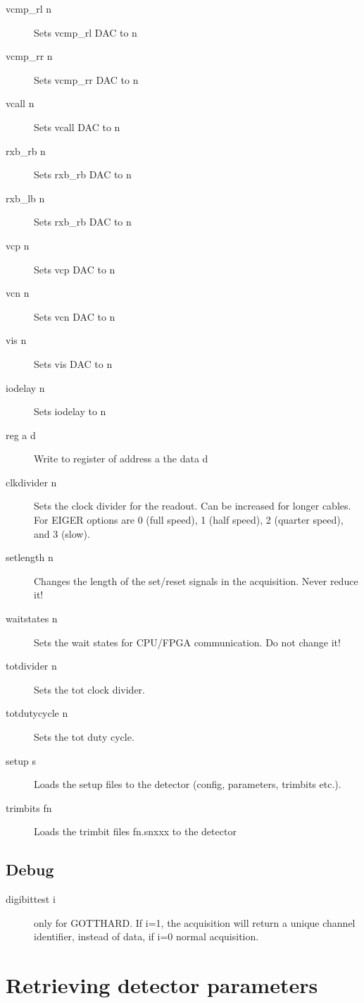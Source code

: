 \documentclass{article}
\newcommand{\E}{EIGER\xspace}
\begin{document}
\begin{description}
\item [vcmp\_rl n] Sets vcmp\_rl DAC to n 
\item [vcmp\_rr n] Sets vcmp\_rr DAC to n 
\item [vcall n] Sets vcall DAC to n 
\item [rxb\_rb n] Sets rxb\_rb DAC to n 
\item [rxb\_lb n] Sets rxb\_rb DAC to n 
\item [vcp n] Sets vcp DAC to n 
\item [vcn n] Sets vcn DAC to n 
\item [vis n] Sets vis DAC to n 
\item [iodelay n] Sets iodelay to n 
\item[reg a d]   Write to register of address a the data d  
\item[clkdivider n]  Sets the clock divider for the readout. Can be increased for longer cables. For \E options are 0 (full speed), 1 (half speed), 2 (quarter speed), and 3 (slow).
\item[setlength n]  Changes the length of the set/reset signals in the acquisition. Never reduce it!     
\item[waitstates n] Sets the wait states for CPU/FPGA communication. Do not change it!
\item[totdivider n]  Sets the tot clock divider.
\item[totdutycycle n] Sets the tot duty cycle.
\item[setup s] Loads the setup files to the detector (config, parameters, trimbits etc.).
\item[trimbits fn] Loads the trimbit files fn.snxxx to the detector
\end{description}
 
 
\subsection{Debug}
\begin{description}
\item[digibittest i] only for GOTTHARD. If i=1, the acquisition will return a unique channel identifier, instead of data, if i=0 normal acquisition.  
\end{description}


\section{Retrieving detector parameters}
\end{document}
